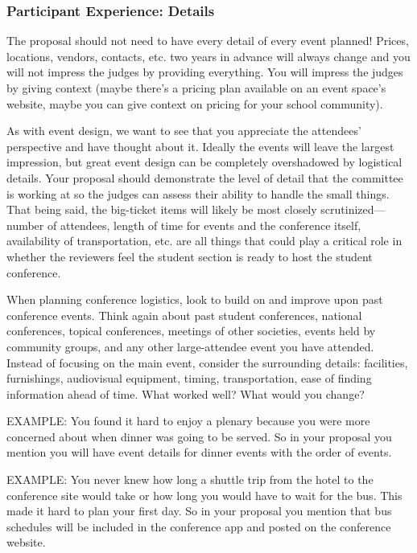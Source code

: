 \documentclass[12pt]{article}
\begin{document}
\subsubsection{Participant Experience: Details}
The proposal should not need to have every detail of every event planned! Prices, locations, vendors, contacts, etc. two years in advance will always change and you will not impress the judges by providing everything. You will impress the judges by giving context (maybe there's a pricing plan available on an event space's website, maybe you can give context on pricing for your school community).

As with event design, we want to see that you appreciate the attendees’ perspective and have thought about it. Ideally the events will leave the largest impression, but great event design can be completely overshadowed by logistical details. Your proposal should demonstrate the level of detail that the committee is working at so the judges can assess their ability to handle the small things. That being said, the big-ticket items will likely be most closely scrutinized---number of attendees, length of time for events and the conference itself, availability of transportation, etc. are all things that could play a critical role in whether the reviewers feel the student section is ready to host the student conference.

When planning conference logistics, look to build on and improve upon past conference events. Think again about past student conferences, national conferences, topical conferences, meetings of other societies, events held by community groups, and any other large-attendee event you have attended. Instead of focusing on the main event, consider the surrounding details: facilities, furnishings, audiovisual equipment, timing, transportation, ease of finding information ahead of time. What worked well? What would you change?

EXAMPLE: You found it hard to enjoy a plenary because you were more concerned about when dinner was going to be served. So in your proposal you mention you will have event details for dinner events with the order of events.

EXAMPLE: You never knew how long a shuttle trip from the hotel to the conference site would take or how long you would have to wait for the bus. This made it hard to plan your first day. So in your proposal you mention that bus schedules will be included in the conference app and posted on the conference website.
\end{document}
